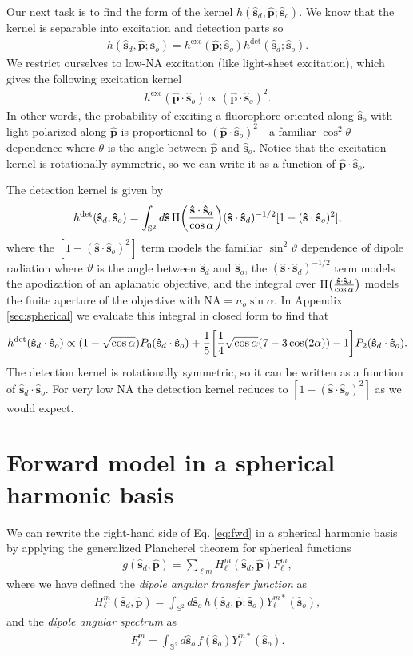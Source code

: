 \documentclass[11pt]{article}
\providecommand{\so}{\mathbf{\hat{s}}_o}
\providecommand{\sd}{\mathbf{\hat{s}}_d}
\providecommand{\pp}{\mathbf{\hat{p}}}
\providecommand{\mh}[1]{\mathbf{\hat{#1}}}
\providecommand{\mbb}[1]{\mathbb{#1}}
\providecommand{\ints}[1]{\int_{\mbb{S}^{#1}}}
\let\originalleft\left
\let\originalright\right
\renewcommand{\left}{\mathopen{}\mathclose\bgroup\originalleft}
\renewcommand{\right}{\aftergroup\egroup\originalright}
\begin{document}
Our next task is to find the form of the kernel $h(\sd,\pp;\so)$. We know that
the kernel is separable into excitation and detection parts so
\begin{align}
  h(\sd, \pp;\so) = h^{\text{exc}}(\pp;\so)h^{\text{det}}(\sd;\so). \label{eq:kern}
\end{align}
We restrict ourselves to low-NA excitation (like light-sheet excitation), which
gives the following excitation kernel
\begin{align}
  h^{\text{exc}}(\pp\cdot\so) \propto (\pp\cdot\so)^2. \label{eq:exckern}
\end{align}
In other words, the probability of exciting a fluorophore oriented along $\so$
with light polarized along $\pp$ is proportional to $(\pp\cdot\so)^2$---a
familiar $\cos^2\theta$ dependence where $\theta$ is the angle between $\pp$ and
$\so$. Notice that the excitation kernel is rotationally symmetric, so we can
write it as a function of $\pp\cdot\so$.

The detection kernel is given by
\begin{align}
  h^{\text{det}}(\sd,\so) = \ints{2}d\mh{s}\,\Pi\left(\frac{\mh{s}\cdot\sd}{\cos\alpha}\right)(\mh{s}\cdot\sd)^{-1/2}[1 - (\mh{s}\cdot\so)^2], \label{eq:detkern}
\end{align}
where the $[1 - (\mh{s}\cdot\so)^2]$ term models the familiar $\sin^2\vartheta$
dependence of dipole radiation where $\vartheta$ is the angle between $\sd$ and
$\so$, the $(\mh{s}\cdot\sd)^{-1/2}$ term models the apodization of an aplanatic
objective, and the integral over
$\Pi\left(\frac{\mh{s}\cdot\sd}{\cos\alpha}\right)$ models the finite aperture
of the objective with $\text{NA} = n_o\sin\alpha$. In Appendix
\ref{sec:spherical} we evaluate this integral in closed form to find that
\begin{align}
  h^{\text{det}}(\sd\cdot\so) \propto (1 - \sqrt{\cos\alpha})P_0(\sd\cdot\so) + \frac{1}{5}\left[\frac{1}{4}\sqrt{\cos\alpha}(7-3\cos(2\alpha)) - 1\right]P_2(\sd\cdot\so).
\end{align}
The detection kernel is rotationally symmetric, so it can be written as a
function of $\sd\cdot\so$. For very low NA the detection kernel reduces to
$[1 - (\mh{s}\cdot\so)^2]$ as we would expect.

\section{Forward model in a spherical harmonic basis} \label{sec:shsec}We can rewrite the right-hand side of Eq. \eqref{eq:fwd} in a spherical harmonic
basis by applying the generalized Plancherel theorem for spherical functions
\begin{align}
  g(\sd, \pp) = \sum_{\ell m}H_\ell^m(\sd, \pp)F_\ell^m,\label{eq:fwdsh}
\end{align}
where we have defined the \textit{dipole angular transfer function} as
\begin{align}
  H_\ell^m(\sd, \pp) = \ints{2}d\so\, h(\sd,\pp;\so)Y_\ell^{m*}(\so),
\end{align}
and the \textit{dipole angular spectrum} as
\begin{align}
  F_\ell^m = \ints{2}d\so\, f(\so)Y_\ell^{m*}(\so).
\end{align}
\end{document}
